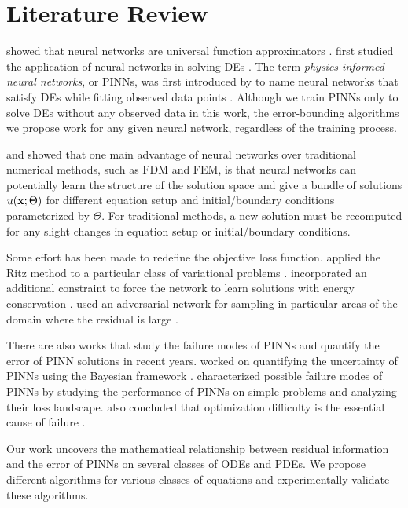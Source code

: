 
\chapter{Literature Review} \label{chapter:literature-review}
    \citeauthor{hornik1989multilayer} showed that neural networks are universal function approximators \cite{hornik1989multilayer}. 
    \citeauthor{lagaris1998artificial} first studied the application of neural networks in solving DEs \cite{lagaris1998artificial}.
    The term \textit{physics-informed neural networks}, or PINNs, was first introduced by \citeauthor{raissi2019physics} to name neural networks that satisfy DEs while fitting observed data points \cite{raissi2019physics}. 
    Although we train PINNs only to solve DEs without any observed data in this work, the error-bounding algorithms we propose work for any given neural network, regardless of the training process.

    \citeauthor{flamant2020solving} and \citeauthor{DesaiShaan2021OTLo} showed that one main advantage of neural networks over traditional numerical methods, such as FDM and FEM, is that neural networks can potentially learn the structure of the solution space and give a bundle of solutions $u(\mathbf{x}; \Theta)$ for different equation setup and initial/boundary conditions parameterized by $\Theta$.
    For traditional methods, a new solution must be recomputed for any slight changes in equation setup or initial/boundary conditions.

    Some effort has been made to redefine the objective loss function. 
    \citeauthor{yu2017deep} applied the Ritz method to a particular class of variational problems \cite{yu2017deep}.
    \citeauthor{mattheakis2020hamiltonian} incorporated an additional constraint to force the network to learn solutions with energy conservation \cite{mattheakis2020hamiltonian}.
    \citeauthor{parwani2021adversarial} used an adversarial network for sampling in particular areas of the domain where the residual is large \cite{parwani2021adversarial}.

    There are also works that study the failure modes of PINNs and quantify the error of PINN solutions in recent years. 
    \citeauthor{graf2021uncertainty} worked on quantifying the uncertainty of PINNs using the Bayesian framework \cite{graf2021uncertainty}.
    \citeauthor{krishnapriyan2021characterizing} characterized possible failure modes of PINNs by studying the performance of PINNs on simple problems and analyzing their loss landscape. 
    \citeauthor{krishnapriyan2021characterizing} also concluded that optimization difficulty is the essential cause of failure \cite{krishnapriyan2021characterizing}.

    Our work uncovers the mathematical relationship between residual information and the error of PINNs on several classes of ODEs and PDEs. 
    We propose different algorithms for various classes of equations and experimentally validate these algorithms.
